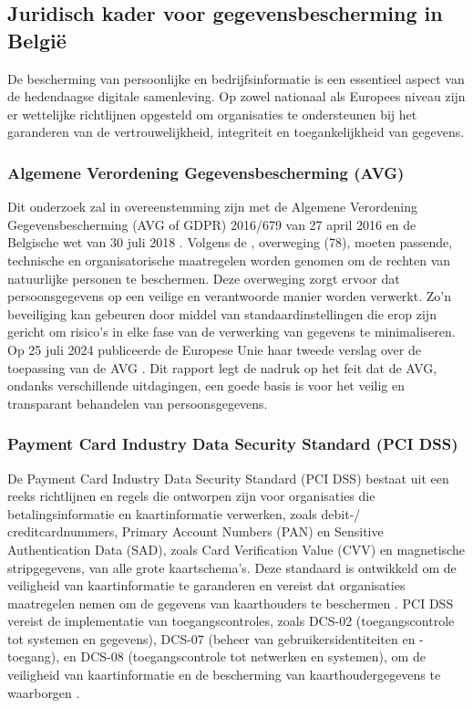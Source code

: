 \subsection{Juridisch kader voor gegevensbescherming in België}%

De bescherming van persoonlijke en bedrijfsinformatie is een essentieel aspect van de hedendaagse digitale samenleving. 
Op zowel nationaal als Europees niveau zijn er wettelijke richtlijnen opgesteld om organisaties te ondersteunen bij het garanderen van de vertrouwelijkheid, 
integriteit en toegankelijkheid van gegevens.

\subsubsection{Algemene Verordening Gegevens\-besch\-erming (AVG)}%

Dit onderzoek zal in overeenstemming zijn met de Algemene Verordening Gegevensbescherming (AVG of GDPR) 2016/679 van 27 april 2016 \autocite{eu_avg2016} en de Belgische wet van 30 juli 2018 \autocite{BelgischeOverheid2018}.
Volgens de \textcite{eu_avg2016}, overweging (78), moeten passende, technische en organisatorische maatregelen worden genomen om de rechten van natuurlijke personen te beschermen. 
Deze overweging zorgt ervoor dat persoonsgegevens op een veilige en verantwoorde manier worden verwerkt. 
Zo'n beveiliging kan gebeuren door middel van standaardinstellingen die erop zijn gericht om risico's in elke fase van de verwerking van gegevens te minimaliseren.
Op 25 juli 2024 publiceerde de Europese Unie haar tweede verslag over de toepassing van de AVG \autocite{eu_avg2024}. 
Dit rapport legt de nadruk op het feit dat de AVG, ondanks verschillende uitdagingen, een goede basis is voor het veilig en transparant behandelen van persoonsgegevens. 


\subsubsection{Payment Card Industry Data Security Standard (PCI DSS)}%

De Payment Card Industry Data Security Stand\-ard (PCI DSS) bestaat uit een reeks richtlijnen en regels die ontworpen zijn voor organisaties die betalingsinformatie en kaartinformatie verwerken, 
zoals debit-/ creditcardnummers, Primary Account Numbers (PAN) en Sensitive Authentication Data (SAD), zoals Card Verification Value (CVV) en magnetische stripgegevens, van alle grote kaartsche\-ma's. 
Deze standaard is ontwikkeld om de veiligheid van kaartinformatie te garanderen en vereist dat organisaties maatregelen nemen om de gegevens van kaarthouders te beschermen \autocite{Elluri2018}. 
PCI DSS vereist de implementatie van toegangscontroles, zoals DCS-02 (toegangscontrole tot systemen en gegevens), DCS-07 (beheer van gebruikersidentiteiten en -toegang), 
en DCS-08 (toegangscontrole tot netwerken en systemen), om de veiligheid van kaartinformatie en de bescherming van kaarthoudergegevens te waarborgen \autocite{Elluri2018}.

